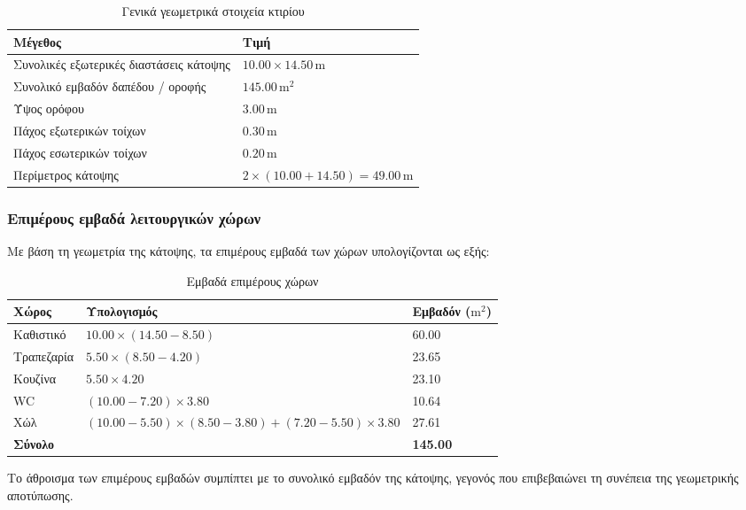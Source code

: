 \documentclass[12pt,a4paper]{article}
\begin{document}
\begin{table}[H]
\centering
\caption{Γενικά γεωμετρικά στοιχεία κτιρίου}
\begin{tabularx}{\textwidth}{L C{3.2cm}}
\toprule
\textbf{Μέγεθος} & \textbf{Τιμή} \\
\midrule
Συνολικές εξωτερικές διαστάσεις κάτοψης & \(10.00 \times 14.50\,\mathrm{m}\) \\
Συνολικό εμβαδόν δαπέδου / οροφής & \(145.00\,\mathrm{m^2}\) \\
Ύψος ορόφου & \(3.00\,\mathrm{m}\) \\
Πάχος εξωτερικών τοίχων & \(0.30\,\mathrm{m}\) \\
Πάχος εσωτερικών τοίχων & \(0.20\,\mathrm{m}\) \\
Περίμετρος κάτοψης & \(2 \times (10.00 + 14.50) = 49.00\,\mathrm{m}\) \\
\bottomrule
\end{tabularx}
\end{table}

\subsubsection{Επιμέρους εμβαδά λειτουργικών χώρων}

Με βάση τη γεωμετρία της κάτοψης, τα επιμέρους εμβαδά των χώρων υπολογίζονται ως εξής:

\begin{table}[H]
\centering
\small
\caption{Εμβαδά επιμέρους χώρων}
\begin{tabularx}{\textwidth}{L L C{2.8cm}}
\toprule
\textbf{Χώρος} & \textbf{Υπολογισμός} & \textbf{Εμβαδόν (\(\mathrm{m^2}\))} \\
\midrule
Καθιστικό & \(10.00 \times (14.50 - 8.50)\) & 60.00 \\
Τραπεζαρία & \(5.50 \times (8.50 - 4.20)\) & 23.65 \\
Κουζίνα & \(5.50 \times 4.20\) & 23.10 \\
WC & \((10.00 - 7.20) \times 3.80\) & 10.64 \\
Χώλ & \((10.00 - 5.50)\times(8.50 - 3.80) + (7.20 - 5.50)\times 3.80\) & 27.61 \\
\midrule
\textbf{Σύνολο} &  & \textbf{145.00} \\
\bottomrule
\end{tabularx}
\end{table}

Το άθροισμα των επιμέρους εμβαδών συμπίπτει με το συνολικό εμβαδόν της κάτοψης,
γεγονός που επιβεβαιώνει τη συνέπεια της γεωμετρικής αποτύπωσης.
\end{document}
